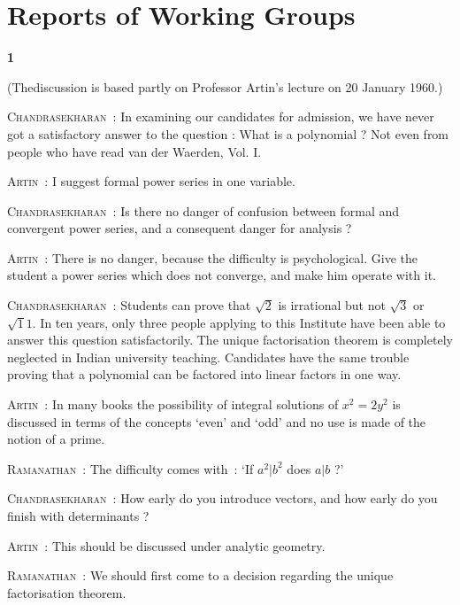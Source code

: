 \chapter{Reports of Working Groups}

\begin{center}
{\large\bf 1}
\end{center}
\medskip

\setcounter{pageoriginal}{170}
\noindent
(The\pageoriginale discussion is based partly on Professor Artin's lecture on 20 January 1960.)

\medskip
\noindent
\textsc{Chandrasekharan}~: In examining our candidates for admission, we have never got a satisfactory answer to the question : What is a polynomial ? Not even from people who have read van der Waerden, Vol. I.

\smallskip
\noindent
\textsc{Artin}~: I suggest formal power series in one variable.

\smallskip
\noindent
\textsc{Chandrasekharan}~: Is there no danger of confusion between formal and convergent power series, and a consequent danger for analysis ?

\smallskip
\noindent
\textsc{Artin}~: There is no danger, because the difficulty is psychological. Give the student a power series which does not converge, and make him operate with it.

\smallskip
\noindent
\textsc{Chandrasekharan}~: Students can prove that $\surd 2$ is irrational but not $\surd 3$ or $\surd 11$. In ten years, only three people applying to this Institute have been able to answer this question satisfactorily. The unique factorisation theorem is completely neglected in Indian university teaching. Candidates have the same trouble proving that a polynomial can be factored into linear factors in one way.

\smallskip
\noindent
\textsc{Artin}~: In many books the possibility of integral solutions of $x^{2}=2y^{2}$ is discussed in terms of the concepts `even' and `odd' and no use is made of the notion of a prime.

\smallskip
\noindent
\textsc{Ramanathan}~: The difficulty comes with~: `If $a^{2}|b^{2}$ does $a|b$ ?'

\smallskip
\noindent
\textsc{Chandrasekharan}~: How early do you introduce vectors, and how early do you finish with determinants ?

\smallskip
\noindent
\textsc{Artin}~: This should be discussed under analytic geometry.

\smallskip
\noindent
\textsc{Ramanathan}~: We should first come to a decision regarding the unique factorisation theorem.

